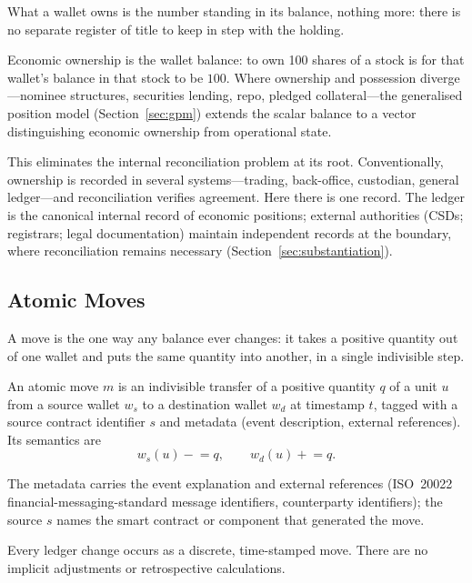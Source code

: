 What a wallet owns is the number standing in its balance, nothing more: there is no separate register of title to keep in step with the holding.

\begin{principle}[Ownership]
Economic ownership is the wallet balance: to own 100 shares of a stock is for that wallet's balance in that stock to be $100$. Where ownership and possession diverge---nominee structures, securities lending, repo, pledged collateral---the generalised position model (Section~\ref{sec:gpm}) extends the scalar balance to a vector distinguishing economic ownership from operational state.
\end{principle}

This eliminates the internal reconciliation problem at its root. Conventionally, ownership is recorded in several systems---trading, back-office, custodian, general ledger---and reconciliation verifies agreement. Here there is one record. The ledger is the canonical internal record of economic positions; external authorities (CSDs; registrars; legal documentation) maintain independent records at the boundary, where reconciliation remains necessary (Section~\ref{sec:substantiation}).

\subsection{Atomic Moves}

A move is the one way any balance ever changes: it takes a positive quantity out of one wallet and puts the same quantity into another, in a single indivisible step.

\begin{definition}[Move]
An atomic move $m$ is an indivisible transfer of a positive quantity $q$ of a unit $u$ from a source wallet $w_s$ to a destination wallet $w_d$ at timestamp $t$, tagged with a source contract identifier $s$ and metadata (event description, external references). Its semantics are
\[
w_s(u) \mathrel{-}= q, \qquad w_d(u) \mathrel{+}= q.
\]
\end{definition}

The metadata carries the event explanation and external references (ISO~20022 financial-messaging-standard message identifiers, counterparty identifiers); the source $s$ names the smart contract or component that generated the move.

\begin{principle}[Atomicity]
Every ledger change occurs as a discrete, time-stamped move. There are no implicit adjustments or retrospective calculations.
\end{principle}

